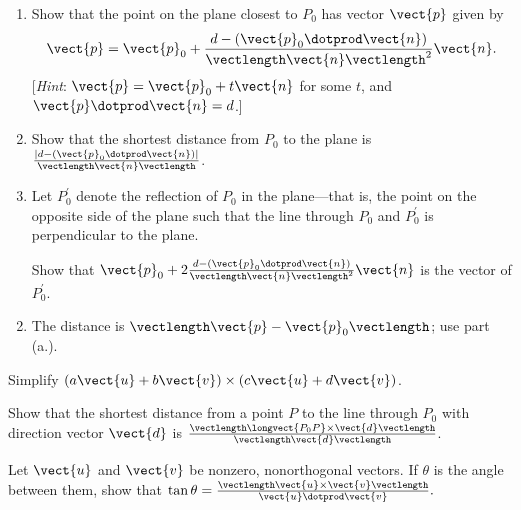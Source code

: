 \begin{multicols}{2}
\begin{ex}
\begin{enumerate}[label={\alph*.}]
\item Show that the point on the plane closest to $P_{0}$ has vector $\vect{p}$ given by
\begin{equation*}
\vect{p} = \vect{p}_{0} + \frac{d - (\vect{p}_{0} \dotprod \vect{n})}{\vectlength \vect{n} \vectlength^2}\vect{n}.
\end{equation*}
[\textit{Hint}: $\vect{p} = \vect{p}_{0} + t\vect{n}$ for some $t$, and $\vect{p} \dotprod \vect{n} = d$.]

\item Show that the shortest distance from $P_{0}$ to the plane is $\frac{|d - (\vect{p}_{0} \dotprod \vect{n})|}{\vectlength \vect{n} \vectlength}$.

\item Let $P_{0}^\prime$ denote the reflection of $P_{0}$ in the plane---that is, the point on the opposite side of the plane such that the line through $P_{0}$ and $P_{0}^\prime$ is perpendicular to the plane.


Show that $\vect{p}_{0} + 2\frac{d - (\vect{p}_{0} \dotprod \vect{n})}{\vectlength \vect{n} \vectlength^2}\vect{n}$ is the vector of $P_{0}^\prime$.

\end{enumerate}
\begin{sol}
\begin{enumerate}[label={\alph*.}]
\setcounter{enumi}{1}
\item  The distance is $\vectlength\vect{p} - \vect{p}_{0}\vectlength$; use part (a.).

\end{enumerate}
\end{sol}
\end{ex}

\begin{ex}
Simplify $(a\vect{u} + b\vect{v}) \times (c\vect{u} + d\vect{v})$.
\end{ex}

\begin{ex}
Show that the shortest distance from a point $P$ to the line through $P_{0}$ with direction vector $\vect{d}$ is $\frac{\vectlength \longvect{P_{0}P} \times \vect{d} \vectlength}{\vectlength \vect{d} \vectlength}$.
\end{ex}

\begin{ex}
Let $\vect{u}$ and $\vect{v}$ be nonzero, nonorthogonal vectors. If $\theta$ is the angle between them, show that $\tan\theta = \frac{\vectlength \vect{u} \times \vect{v} \vectlength}{\vect{u} \dotprod \vect{v}}.$
\end{ex}


\end{multicols}
